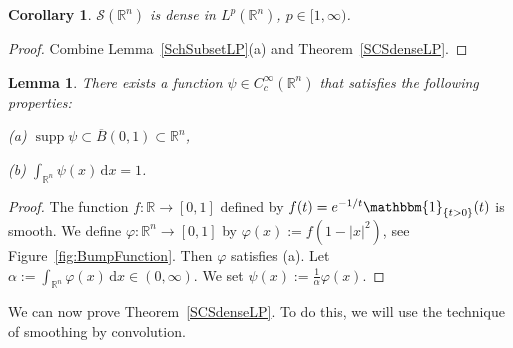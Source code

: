 \documentclass[12pt, oneside, a4paper]{article}
\newtheorem{lem}[thm]{Lemma}
\newtheorem{cor}[thm]{Corollary}
\def\Ind{\mathbbm{1}}
\def\supp{\operatorname{supp}}
\theoremstyle{dfn}
\def \S {\ensuremath{\mathcal{S}}}
\def \S {\ensuremath{\mathcal{S}}}
\def\Rbb{\ensuremath{\mathbb{R}}}
\def\dx{\,\mathrm dx}
\providecommand{\abs}[1]{\lvert#1\rvert}
\begin{document}
\begin{cor}
$\S(\Rbb^n)$ is dense in $L^p(\Rbb^n)$, $p \in [1,\infty)$.
\end{cor}

\begin{proof}
Combine Lemma~\ref{SchSubsetLP}(a) and Theorem~\ref{SCSdenseLP}.
\end{proof}

\begin{lem}\label{ExistsABumpFunction}
There exists a function $\psi \in C_c^\infty(\Rbb^n)$ that satisfies the following properties:

(a) $\supp \psi \subset \overline{B}(0,1) \subset \Rbb^n$,


(b) $\int_{\Rbb^n} \psi(x) \dx = 1$.

\end{lem}

\begin{proof}
The function $f \colon \Rbb \to [0,1]$ defined by
$
f(t) = e^{-1/t} \Ind_{\{t>0\}}(t)
$
is smooth. We define $\varphi \colon \Rbb^n \to [0,1]$ by
$
\varphi(x) := f(1 - \abs{x}^2)
$, see Figure~\ref{fig:BumpFunction}.
Then $\varphi$ satisfies (a). Let $\alpha := \int_{\Rbb^n} \varphi(x) \dx \in (0,\infty)$. We set
$
\psi(x) := \frac{1}{\alpha} \varphi(x).
$
\end{proof}

We can now prove Theorem~\ref{SCSdenseLP}. To do this, we will use the technique of smoothing by convolution.
\end{document}
